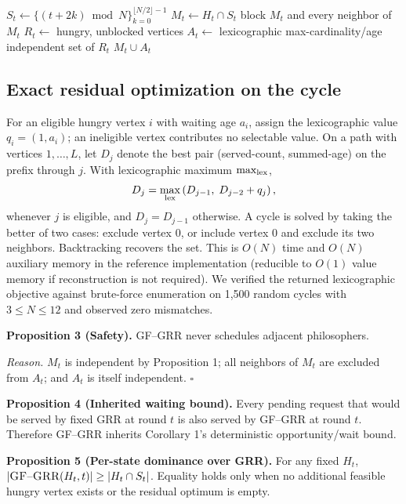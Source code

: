 \documentclass[10pt,journal]{IEEEtran}
\newcommand{\GF}{\textsc{GF--GRR}\xspace}
\begin{document}
\begin{algorithm}[t]
\caption{Guarded-Fill GRR for round $t$}
\begin{algorithmic}[1]
\State $S_t\gets\{(t+2k)\bmod N\}_{k=0}^{\lfloor N/2\rfloor-1}$
\State $M_t\gets H_t\cap S_t$ 
\State block $M_t$ and every neighbor of $M_t$
\State $R_t\gets$ hungry, unblocked vertices
\State $A_t\gets$ lexicographic max-cardinality/age independent set of $R_t$
\State \Return $M_t\cup A_t$
\end{algorithmic}
\end{algorithm}

\subsection{Exact residual optimization on the cycle}
For an eligible hungry vertex $i$ with waiting age $a_i$, assign the lexicographic value $q_i=(1,a_i)$; an ineligible vertex contributes no selectable value. On a path with vertices $1,\ldots,L$, let $D_j$ denote the best pair (served-count, summed-age) on the prefix through $j$. With lexicographic maximum $\max_{\rm lex}$,
\begin{equation}
D_j=\max_{\rm lex}\left(D_{j-1},\;D_{j-2}+q_j\right),
\end{equation}
whenever $j$ is eligible, and $D_j=D_{j-1}$ otherwise. A cycle is solved by taking the better of two cases: exclude vertex 0, or include vertex 0 and exclude its two neighbors. Backtracking recovers the set. This is $O(N)$ time and $O(N)$ auxiliary memory in the reference implementation (reducible to $O(1)$ value memory if reconstruction is not required). We verified the returned lexicographic objective against brute-force enumeration on 1,500 random cycles with $3\le N\le12$ and observed zero mismatches.

\textbf{Proposition 3 (Safety).} \GF never schedules adjacent philosophers.

\emph{Reason.} $M_t$ is independent by Proposition 1; all neighbors of $M_t$ are excluded from $A_t$; and $A_t$ is itself independent. \hfill$\square$

\textbf{Proposition 4 (Inherited waiting bound).} Every pending request that would be served by fixed GRR at round $t$ is also served by \GF at round $t$. Therefore \GF inherits Corollary 1's deterministic opportunity/wait bound.

\textbf{Proposition 5 (Per-state dominance over GRR).} For any fixed $H_t$, $|\GF(H_t,t)|\ge|H_t\cap S_t|$. Equality holds only when no additional feasible hungry vertex exists or the residual optimum is empty.
\end{document}
